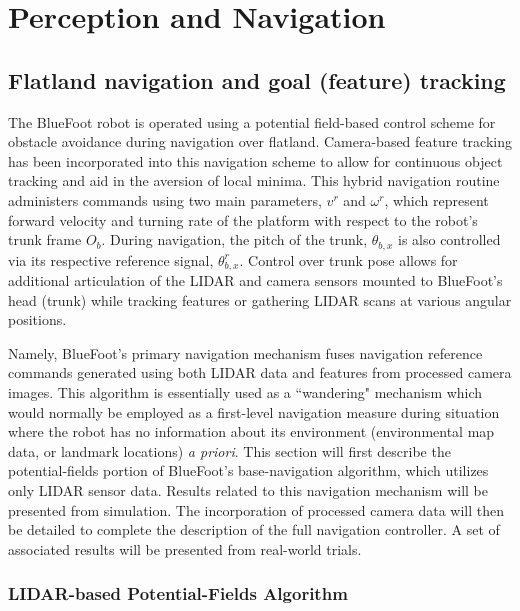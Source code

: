 \chapter{Perception and Navigation}
\label{ch::navigation}


	\section{Flatland navigation and goal (feature) tracking}
	
		The BlueFoot robot is operated using a potential field-based control scheme for obstacle avoidance during navigation over flatland. Camera-based feature tracking has been incorporated into this navigation scheme to allow for continuous object tracking and aid in the aversion of local minima. This hybrid navigation routine administers commands using two main parameters, $v^{r}$ and $\omega^{r}$, which represent forward velocity and turning rate of the platform with respect to the robot's trunk frame $O_{b}$. During navigation, the pitch of the trunk, $\theta_{b,x}$ is also controlled via its respective reference signal, $\theta_{b,x}^{r}$. Control over trunk pose allows for additional articulation of the LIDAR and camera sensors mounted to BlueFoot's head (trunk) while tracking features or gathering LIDAR scans at various angular positions.

		Namely, BlueFoot's primary navigation mechanism fuses navigation reference commands generated using both LIDAR data and features from processed camera images. This algorithm is essentially used as a ``wandering" mechanism which would normally be employed as a first-level navigation measure during situation where the robot has no information about its environment (\IE environmental map data, or landmark locations) \emph{a priori}. This section will first describe the potential-fields portion of BlueFoot's base-navigation algorithm, which utilizes only LIDAR sensor data. Results related to this navigation mechanism will be presented from simulation. The incorporation of processed camera data will then be detailed to complete the description of the full navigation controller. A set of associated results will be presented from real-world trials.

		\subsection{LIDAR-based Potential-Fields Algorithm}

